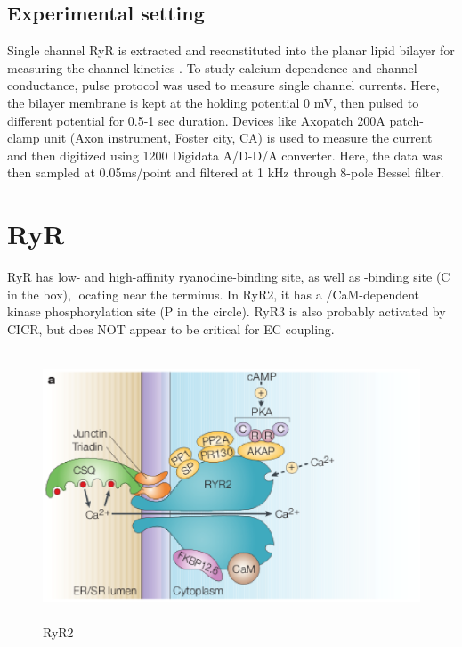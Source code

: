 \subsection{Experimental setting}

Single channel RyR is extracted and reconstituted into the planar lipid bilayer
for measuring the channel kinetics \citep{Bhat1997}. To study calcium-dependence
and channel conductance, pulse protocol was used to measure single channel
currents. Here, the bilayer membrane is kept at the holding potential 0 mV, then
pulsed to different potential for 0.5-1 sec duration. Devices like Axopatch 200A
patch-clamp unit (Axon instrument, Foster city, CA) is used to measure the
current and then digitized using 1200 Digidata A/D-D/A converter. Here, the data
was then sampled at 0.05ms/point and filtered at 1 kHz through 8-pole Bessel
filter. 




\section{RyR}
\label{sec:ryr}

RyR has low- and high-affinity ryanodine-binding site, as well as
-binding site (C in the box), locating near the 
terminus. In RyR2, it has a /CaM-dependent kinase
phosphorylation site (P in the circle). RyR3 is also probably
activated by CICR, but does NOT appear to be critical for EC
coupling. 


\begin{figure}[htb]
  \centerline{\includegraphics[height=8cm]{./images/RyR2.eps}}
  \caption{RyR2}\label{fig:RyR2}
\end{figure}

